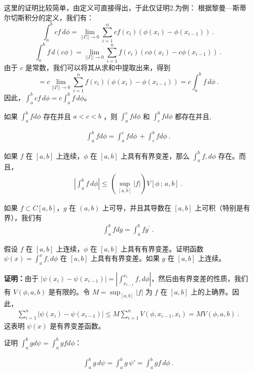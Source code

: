 这里的证明比较简单，由定义可直接得出，于此仅证明2.为例：
根据黎曼—斯蒂尔切斯积分的定义，我们有：
   \[
   \int_{a}^{b}cf\,d\phi = \lim_{||\Gamma|| \to 0} \sum_{i=1}^{n} cf(c_i)(\phi(x_i) - \phi(x_{i-1}))~.
   \]
   \[
   \int_{a}^{b}f\,d(c\phi) = \lim_{||\Gamma|| \to 0} \sum_{i=1}^{n} f(c_i)(c\phi(x_i) - c\phi(x_{i-1}))~.
   \]
   由于 $c$ 是常数，我们可以将其从求和中提取出来，得到
\[
   = c\lim_{||\Gamma|| \to 0} \sum_{i=1}^{n} f(c_i)(\phi(x_i) - \phi(x_{i-1})) = c\int_{a}^{b}f\,d\phi~.
   \]
   因此，$\int_{a}^{b}cf\,d\phi=c\int_{a}^{b}f\,d\phi$。

\begin{theorem}{}
如果 $ \int_{a}^{b}fd\phi $ 存在并且 $ a<c<b $ ，则 $ \int_{a}^{c}fd\phi $ 和 $ \int_{c}^{b}fd\phi $ 都存在并且,

\begin{align}
\int_{a}^{b}fd\phi=\int_{a}^{c}fd\phi\,+\int_{c}^{b}fd\phi~.
\end{align}
\end{theorem}



\begin{theorem}{}
如果 $f$ 在 $[a,b]$ 上连续，$\phi$ 在 $[a,b]$ 上具有有界变差，那么 $ \int_{a}^{b}f,d\phi$ 存在。而且，
\begin{align}
  \left|\int_{a}^{b}f\,d\phi\right|\leq\,(\sup_{[a,b]}|f|)V[\phi\,;\,a,b]~.
\end{align}

\end{theorem}

\begin{theorem}{}
如果 $f\subset C[a,b]$，$g$ 在 $(a,b)$ 上可导，并且其导数在 $[a,b]$ 上可积（特别是有界），我们有
\begin{align}
\int_{a}^{b}fdg=\int_{a}^{b}fg^{\prime}~.
\end{align}
\end{theorem}

\begin{example}{假设 $f$ 在 $[a,b]$ 上连续，$\phi$ 在 $[a,b]$ 上具有有界变差。证明函数 $\psi(x)=\int_{a}^{x}f,d\phi$ 在 $[a,b]$ 上具有有界变差。如果 $g$ 在 $[a,b]$ 上连续。}

\textbf{证明：}由于 $ |\psi(x_i) - \psi(x_{i-1})| = \left|\int_{x_{i-1}}^{x_i}f , d\phi\right| $，然后由有界变差的性质，我们有 $ V(\phi, a, b) $ 是有限的。令 $ M = \sup_{[a,b]}|f| $ 为 $ f $ 在 $ [a, b] $ 上的上确界。因此， \begin{align} \sum_{i=1}^n |\psi(x_i) - \psi(x_{i-1})| \leq M \sum_{i=1}^n V(\phi,x_{i-1},x_i) = MV(\phi,a,b)~. \end{align} 这表明 $ \psi(x) $ 是有界变差函数。

证明 $\int_{a}^{b}gd\psi=\int_{a}^{b}gfd\phi$：

\begin{align}
\int_{a}^{b}g\,d\psi=\int_{a}^{b}g\,\psi'=\int_{a}^{b}gf\,d\phi~.
\end{align}
\end{example}

